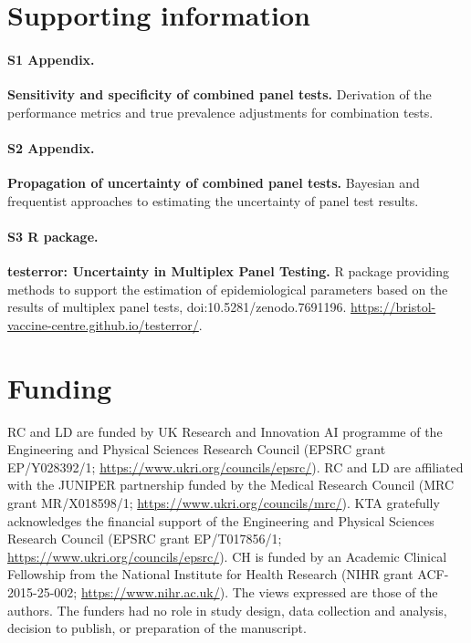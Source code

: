 \documentclass[10pt,letterpaper]{article}
\begin{document}
\section*{Supporting information}


\paragraph*{S1 Appendix.}
\label{S1_Appendix}
{\bf Sensitivity and specificity of combined panel tests.} Derivation of the performance metrics and true prevalence adjustments for combination tests.

\paragraph*{S2 Appendix.}
\label{S2_Appendix}
{\bf Propagation of uncertainty of combined panel tests.} Bayesian and frequentist approaches to estimating the uncertainty of panel test results.

\paragraph*{S3 R package.}
\label{S3_Github}
{\bf testerror: Uncertainty in Multiplex Panel Testing.}  R package providing methods to support the estimation of epidemiological parameters based on the results of multiplex panel tests, doi:10.5281/zenodo.7691196. \url{https://bristol-vaccine-centre.github.io/testerror/}.

\section*{Funding}

RC and LD are funded by UK Research and Innovation AI programme of the Engineering and Physical Sciences Research Council (EPSRC grant EP/Y028392/1; \url{https://www.ukri.org/councils/epsrc/}). RC and LD are affiliated with the JUNIPER partnership funded by the Medical Research Council (MRC grant MR/X018598/1; \url{https://www.ukri.org/councils/mrc/}). KTA gratefully acknowledges the financial support of the Engineering and Physical Sciences Research Council (EPSRC grant EP/T017856/1; \url{https://www.ukri.org/councils/epsrc/}). CH is funded by an Academic Clinical Fellowship from the National Institute for Health Research (NIHR grant ACF-2015-25-002; \url{https://www.nihr.ac.uk/}). The views expressed are those of the authors. The funders had no role in study design, data collection and analysis, decision to publish, or preparation of the manuscript.
\end{document}
